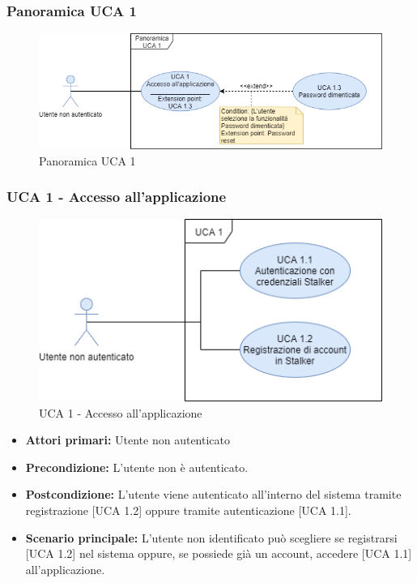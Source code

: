 \subsubsection{Panoramica UCA 1}%

\begin{figure}[h]
  \centering
    \includegraphics[scale=0.7]{sezioni/UseCase/Immagini/PanoramicaUCA1.png}
  \caption{Panoramica UCA 1}
\end{figure}

\subsubsection{UCA 1 - Accesso all'applicazione}%

\begin{figure}[h]
  \centering
    \includegraphics[scale=0.7]{sezioni/UseCase/Immagini/UCA1.png}
  \caption{UCA 1 - Accesso all'applicazione}
\end{figure}

\begin{itemize}
\item \textbf{Attori primari:} Utente non autenticato
\item \textbf{Precondizione:} L'utente non è autenticato.
\item \textbf{Postcondizione:} L'utente viene autenticato all'interno del sistema tramite registrazione [UCA 1.2] oppure tramite autenticazione [UCA 1.1].
\item \textbf{Scenario principale:} L'utente non identificato può scegliere se registrarsi [UCA 1.2] nel sistema oppure, se possiede già un account, accedere [UCA 1.1] all'applicazione. %
\end{itemize}


